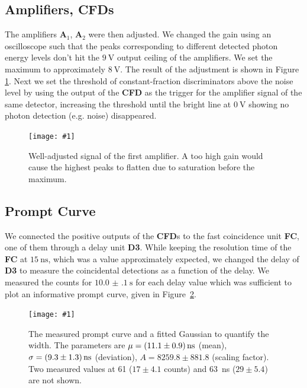 \documentclass[twocolumn]{article}
\newcommand{\insertFigure}[1]{%
   \texttt{[image: \#1]}%
}
\begin{document}
\subsection{Amplifiers, CFDs}
The amplifiers \textbf{A$_1$}, \textbf{A$_2$} were then adjusted. We changed the gain using an oscilloscope such that the peaks corresponding to different detected photon energy levels don't hit the $\SI{9}{\volt}$ output ceiling of the amplifiers. We set the maximum to approximately $\SI{8}{\volt}$. The result of the adjustment is shown in Figure \ref{fig:amp}. Next we set the threshold of constant-fraction discriminators above the noise level by using the output of the \textbf{CFD} as the trigger for the amplifier signal of the same detector, increasing the threshold until the bright line at $\SI{0}{\volt}$ showing no photon detection (e.g. noise) disappeared. 
\begin{figure}[!h]
	\centering
	\insertFigure{./screenshots/SC08_cropped.png}
	\caption{Well-adjusted signal of the first amplifier. A too high gain would cause the highest peaks to flatten due to saturation before the maximum.} 
	\label{fig:amp}
\end{figure}

\subsection{Prompt Curve}
We connected the positive outputs of the \textbf{CFD}s to the fast coincidence unit \textbf{FC}, one of them through a delay unit \textbf{D3}. While keeping the resolution time of the \textbf{FC} at $\SI{15}{\nano\second}$, which was a value approximately expected, we changed the delay of \textbf{D3} to measure the coincidental detections as a function of the delay. We measured the counts for $\SI[separate-uncertainty = true]{10.0(1) }{\second}$ for each delay value which was sufficient to plot an informative prompt curve, given in Figure~\ref{fig:prompt}.
\begin{figure}[!h]
	\centering
	\insertFigure{prompt.png}
	\caption{The measured prompt curve and a fitted Gaussian to quantify the width. The parameters are $\mu = \SI[separate-uncertainty = true]{11.1 \pm 0.9}{\nano\second}$ (mean), $\sigma = \SI[separate-uncertainty = true]{9.3 \pm 1.3}{\nano\second}$ (deviation), $A = 8259.8 \pm	881.8$ (scaling factor). Two measured values at 61 ($17 \pm 4.1$ counts) and 63~ns ($29 \pm 5.4$) are not shown.}
	\label{fig:prompt}
\end{figure}
\end{document}
